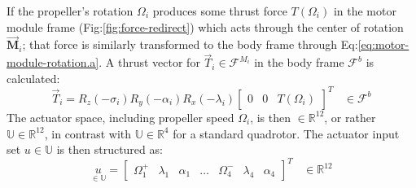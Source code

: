\par
If the propeller's rotation $\Omega_i$ produces some thrust force $T(\Omega_i)$ in the motor module frame (Fig:\ref{fig:force-redirect}) which acts through the center of rotation $\vec{\mathbf{M}}_i$; that force is similarly transformed to the body frame through Eq:\ref{eq:motor-module-rotation.a}. A thrust vector for $\vec{T}_i\in\mathcal{F}^{M_i}$ in the body frame $\mathcal{F}^b$ is calculated:
\begin{equation}\label{eq:motor-module-force-redirect}
\vec{T}_i=R_z(-\sigma_i)R_y(-\alpha_i)R_x(-\lambda_i)\begin{bmatrix}0 & 0 & T(\Omega_i)\end{bmatrix}^T~~~~\in\mathcal{F}^{b}
\end{equation}
The actuator space, including propeller speed $\Omega_i$, is then $\in\mathbb{R}^{12}$, or rather $\mathbb{U}\in\mathbb{R}^{12}$, in contrast with $\mathbb{U}\in\mathbb{R}^4$ for a standard quadrotor. The actuator input set $u \in \mathbb{U}$ is then structured as:
\begin{equation}\label{eq:actuator-space}
\underset{\in\mathbb{U}}{u}=\begin{bmatrix}
\Omega_1^+ & \lambda_1 & \alpha_1 & \ldots & \Omega_4^- & \lambda_4 & \alpha_4
\end{bmatrix}^T~~~~\in\mathbb{R}^{12}
\end{equation}
\newpage
